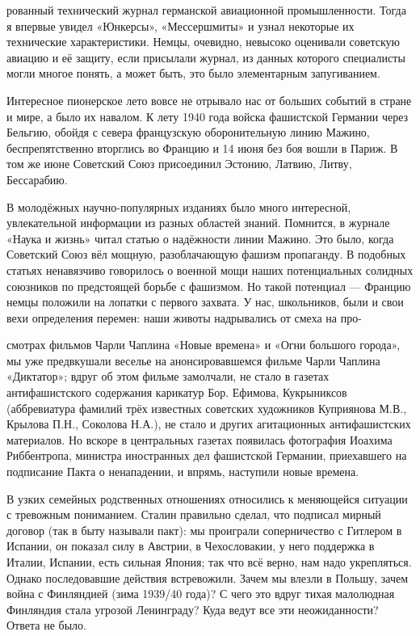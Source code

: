 рованный технический журнал германской авиационной промышленности. Тогда я впервые увидел «Юнкерсы», «Мессершмиты» и узнал некоторые их технические характеристики. Немцы, очевидно, невысоко оценивали советскую авиацию и её защиту, если присылали журнал, из данных которого специалисты могли многое понять, а может быть, это было элементарным запугиванием.

Интересное пионерское лето вовсе не отрывало нас от больших событий в стране и мире, а было их навалом. К лету 1940 года войска фашистской Германии через Бельгию, обойдя с севера французскую оборонительную линию Мажино, беспрепятственно вторглись во Францию и 14 июня без боя вошли в Париж. В том же июне Советский Союз присоединил Эстонию, Латвию, Литву, Бессарабию.

В молодёжных научно-популярных изданиях было много интересной, увлекательной информации из разных областей знаний. Помнится, в журнале «Наука и жизнь» читал статью о надёжности линии Мажино. Это было, когда Советский Союз вёл мощную, разоблачающую фашизм пропаганду. В подобных статьях ненавязчиво говорилось о военной мощи наших потенциальных солидных союзников по предстоящей борьбе с фашизмом. Но такой потенциал — Францию немцы положили на лопатки с первого захвата. У нас, школьников, были и свои вехи определения перемен: наши животы надрывались от смеха на про-

смотрах фильмов Чарли Чаплина «Новые времена» и «Огни большого города», мы уже предвкушали веселье на анонсировавшемся фильме Чарли Чаплина «Диктатор»; вдруг об этом фильме замолчали, не стало в газетах антифашистского содержания карикатур Бор. Ефимова, Кукрыниксов (аббревиатура фамилий трёх известных советских художников Куприянова М.В., Крылова П.Н., Соколова Н.А.), не стало и других агитационных антифашистских материалов. Но вскоре в центральных газетах появилась фотография Иоахима Риббентропа, министра иностранных дел фашистской Германии, приехавшего на подписание Пакта о ненападении, и впрямь, наступили новые времена.

В узких семейных родственных отношениях относились к меняющейся ситуации с тревожным пониманием. Сталин правильно сделал, что подписал мирный договор (так в быту называли пакт): мы проиграли соперничество с Гитлером в Испании, он показал силу в Австрии, в Чехословакии, у него поддержка в Италии, Испании, есть сильная Япония; так что всё верно, нам надо укрепляться. Однако последовавшие действия встревожили. Зачем мы влезли в Польшу, зачем война с Финляндией (зима 1939/40 года)? С чего это вдруг тихая малолюдная Финляндия стала угрозой Ленинграду? Куда ведут все эти неожиданности? Ответа не было.

